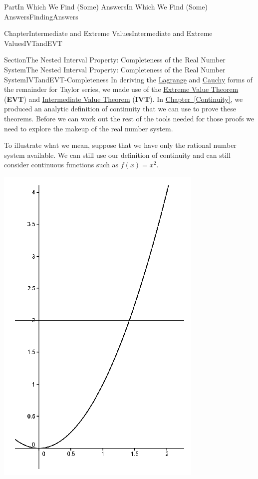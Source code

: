 \documentclass[oneside,10pt,]{book}
\newcommand{\xreffont}{\relax}
\newcommand{\terminology}[1]{\textbf{#1}}
\numberwithin{equation}{part}
\begin{document}
\begin{partptx}{Part}{In Which We Find (Some) Answers}{}{In Which We Find (Some) Answers}{}{}{FindingAnswers}
\begin{chapterptx}{Chapter}{Intermediate and Extreme Values}{}{Intermediate and Extreme Values}{}{}{IVTandEVT}
\begin{sectionptx}{Section}{The Nested Interval Property: Completeness of the Real Number System}{}{The Nested Interval Property: Completeness of the Real Number System}{}{}{IVTandEVT-Completeness}
In deriving the \hyperref[thm_LagrangeRemainder]{Lagrange} and \hyperref[thm_CauchyRemainder]{Cauchy} forms of the remainder for Taylor series, we made use of the \hyperref[thm_EVT]{Extreme Value Theorem} (\terminology{EVT}) and \hyperref[IntermediateValueTheorem]{Intermediate Value Theorem} (\terminology{IVT}).  In \hyperref[Continuity]{Chapter~{\xreffont\ref{Continuity}}}, we produced an analytic definition of continuity that we can use to prove these theorems.  Before we can work out the rest of the tools needed for those proofs we need to explore the make\textendash{}up of the real number system.%
\par
To illustrate what we mean, suppose that we have only the rational number system available.  We can still use our definition of continuity and can still consider continuous functions such as \(f(x)=x^2\).%
\begin{image}{0.315}{0.37}{0.315}{}%
\includegraphics[width=\linewidth]{external/images/Ch6fig1.png}

\end{image}
\end{sectionptx}
\end{chapterptx}
\end{partptx}
\end{document}
